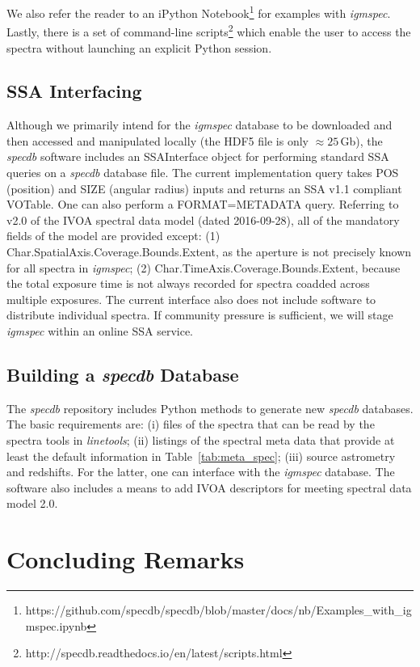 \documentclass[12pt]{elsarticle}
\begin{document}
We also refer the reader to an iPython 
Notebook\footnote{https://github.com/specdb/specdb/blob/master/docs/nb/Examples\_with\_igmspec.ipynb}
for examples with {\it igmspec}.
Lastly, there is a set of command-line 
scripts\footnote{http://specdb.readthedocs.io/en/latest/scripts.html}
which enable the user to access the spectra without
launching an explicit Python session.


\subsection{SSA Interfacing}

Although we primarily intend for the {\it igmspec} database
to be downloaded and then
accessed and manipulated locally 
(the HDF5 file is only $\approx 25$\,Gb),
the {\it specdb} software includes an SSAInterface object for 
performing standard SSA queries on a {\it specdb} database file.
The current implementation query 
takes POS (position) and SIZE (angular radius) 
inputs and returns an SSA v1.1 compliant VOTable. 
One can also perform a FORMAT=METADATA query.
Referring to v2.0 of the IVOA spectral data model (dated
2016-09-28),  all of the mandatory fields of the model
are provided except: (1) Char.SpatialAxis.Coverage.Bounds.Extent,
as the aperture is not precisely known for all spectra in
{\it igmspec};
(2) Char.TimeAxis.Coverage.Bounds.Extent, because
the total exposure time is not always recorded for 
spectra coadded across multiple exposures.
The current interface also does not include software
to distribute individual spectra.  If community pressure is
sufficient, we will stage {\it igmspec} within an online 
SSA service.

\subsection{Building a {\it specdb} Database}

The {\it specdb} repository includes Python methods 
to generate new {\it specdb} databases.
The basic requirements are:
 (i) files of the spectra that can be read by the spectra
 tools in {\it linetools};
 (ii) listings of the spectral meta data that provide at least
 the default information in Table~\ref{tab:meta_spec};
 (iii) source astrometry and redshifts.
For the latter, one can interface with the {\it igmspec} database.
The software also includes a means to add IVOA descriptors
for meeting spectral data model 2.0.  

\section{Concluding Remarks}
\label{sec:end}
\end{document}
